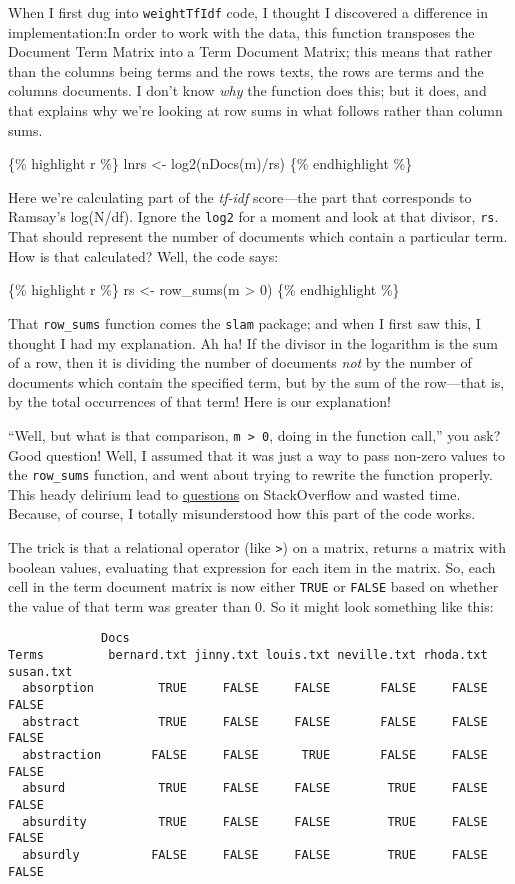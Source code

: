 \documentclass[
  12pt,
]{article}
\begin{document}
When I first dug into \texttt{weightTfIdf} code, I thought I discovered
a difference in implementation:{In order to work with the data, this
function transposes the Document Term Matrix into a Term Document
Matrix; this means that rather than the columns being terms and the rows
texts, the rows are terms and the columns documents. I don't know
\emph{why} the function does this; but it does, and that explains why
we're looking at row sums in what follows rather than column sums.}

\{\% highlight r \%\} lnrs \textless- log2(nDocs(m)/rs) \{\%
endhighlight \%\}

Here we're calculating part of the \emph{tf-idf} score---the part that
corresponds to Ramsay's log(N/df). Ignore the \texttt{log2} for a moment
and look at that divisor, \texttt{rs}. That should represent the number
of documents which contain a particular term. How is that calculated?
Well, the code says:

\{\% highlight r \%\} rs \textless- row\_sums(m \textgreater{} 0) \{\%
endhighlight \%\}

That \texttt{row\_sums} function comes the \texttt{slam} package; and
when I first saw this, I thought I had my explanation. Ah ha! If the
divisor in the logarithm is the sum of a row, then it is dividing the
number of documents \emph{not} by the number of documents which contain
the specified term, but by the sum of the row---that is, by the total
occurrences of that term! Here is our explanation!

``Well, but what is that comparison, \texttt{m\ \textgreater{}\ 0},
doing in the function call,'' you ask? Good question! Well, I assumed
that it was just a way to pass non-zero values to the \texttt{row\_sums}
function, and went about trying to rewrite the function properly. This
heady delirium lead to
\href{http://stackoverflow.com/questions/15045313/changing-tf-idf-weight-function-weight-not-by-occurrences-of-term-but-by-numbe}{questions}
on StackOverflow and wasted time. Because, of course, I totally
misunderstood how this part of the code works.

The trick is that a relational operator (like \texttt{\textgreater{}})
on a matrix, returns a matrix with boolean values, evaluating that
expression for each item in the matrix. So, each cell in the term
document matrix is now either \texttt{TRUE} or \texttt{FALSE} based on
whether the value of that term was greater than 0. So it might look
something like this:

\begin{verbatim}
             Docs
Terms         bernard.txt jinny.txt louis.txt neville.txt rhoda.txt susan.txt
  absorption         TRUE     FALSE     FALSE       FALSE     FALSE     FALSE
  abstract           TRUE     FALSE     FALSE       FALSE     FALSE     FALSE
  abstraction       FALSE     FALSE      TRUE       FALSE     FALSE     FALSE
  absurd             TRUE     FALSE     FALSE        TRUE     FALSE     FALSE
  absurdity          TRUE     FALSE     FALSE        TRUE     FALSE     FALSE
  absurdly          FALSE     FALSE     FALSE        TRUE     FALSE     FALSE
\end{verbatim}
\end{document}
